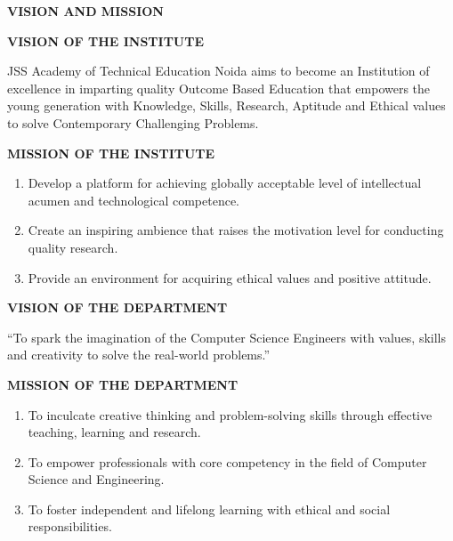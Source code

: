 \begin{center}
{\size\textbf{VISION AND MISSION}}
\end{center}

\vspace{5mm}

\noindent\textbf{VISION OF THE INSTITUTE}

JSS Academy of Technical Education Noida aims to become an Institution of excellence in imparting quality Outcome Based Education that empowers the young generation with Knowledge, Skills, Research, Aptitude and Ethical values to solve Contemporary Challenging Problems.

\noindent\textbf{MISSION OF THE INSTITUTE}
\begin{enumerate}
    \item Develop a platform for achieving globally acceptable level of intellectual acumen and technological competence.
    \item Create an inspiring ambience that raises the motivation level for conducting quality research.
    \item Provide an environment for acquiring ethical values and positive attitude.
\end{enumerate}

\noindent\textbf{VISION OF THE DEPARTMENT}

``To spark the imagination of the Computer Science Engineers with values, skills and creativity to solve the real-world problems.''

\noindent\textbf{MISSION OF THE DEPARTMENT}
\begin{enumerate}
    \item To inculcate creative thinking and problem-solving skills through effective teaching, learning and research.
    \item To empower professionals with core competency in the field of Computer Science and Engineering.
    \item To foster independent and lifelong learning with ethical and social responsibilities.
\end{enumerate}
